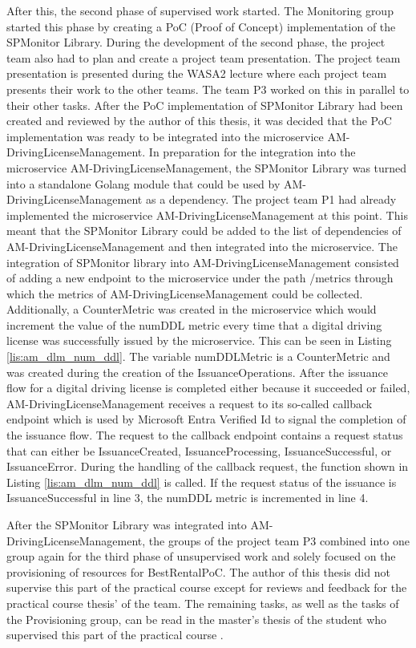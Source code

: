 After this, the second phase of supervised work started. 
The Monitoring group started this phase by creating a PoC (Proof of Concept)
implementation of the SPMonitor Library. During the development of the second phase, the project team also
had to plan and create a project team presentation. The project team presentation is presented during the WASA2 lecture
where each project team presents their work to the other teams. The team P3 worked on this in parallel to their other tasks.
After the PoC implementation of SPMonitor Library had been created and reviewed by the author of this thesis, it was decided
that the PoC implementation was ready to be integrated into the microservice AM-DrivingLicenseManagement.
In preparation for the integration into the microservice AM-DrivingLicenseManagement, the SPMonitor Library was turned into
a standalone Golang module that could be used by AM-DrivingLicenseManagement as a dependency.
The project team P1 had already implemented the microservice AM-DrivingLicenseManagement at this point.
This meant that the SPMonitor Library could be added to the list of dependencies of AM-DrivingLicenseManagement
and then integrated into the microservice. The integration of SPMonitor library into AM-DrivingLicenseManagement
consisted of adding a new endpoint to the microservice under the path /metrics through which the metrics of AM-DrivingLicenseManagement
could be collected. Additionally, a CounterMetric was created in the microservice which would increment the value of the numDDL metric
every time that a digital driving license was successfully issued by the microservice. This can be seen in Listing \ref{lis:am_dlm_num_ddl}.
The variable numDDLMetric is a CounterMetric and was created during the creation of the IssuanceOperations.
After the issuance flow for a digital driving license is completed either because it succeeded or failed,
AM-DrivingLicenseManagement receives a request to its so-called callback endpoint which is used by Microsoft Entra Verified Id \cite{MIC-ENT}
to signal the completion of the issuance flow. The request to the callback endpoint contains a request status
that can either be IssuanceCreated, IssuanceProcessing, IssuanceSuccessful, or IssuanceError.
During the handling of the callback request, the function shown in Listing \ref{lis:am_dlm_num_ddl} is called.
If the request status of the issuance is IssuanceSuccessful in line 3, the numDDL metric is incremented in line 4.

After the SPMonitor Library was integrated into AM-DrivingLicenseManagement,
the groups of the project team P3 combined into one group again for the third phase of unsupervised work
and solely focused on the provisioning of resources for BestRentalPoC.
The author of this thesis did not supervise this part of the practical
course except for reviews and feedback for the practical course thesis' of the team. The remaining
tasks, as well as the tasks of the Provisioning group, can be read in the master's thesis of the student
who supervised this part of the practical course \cite{Go23}.

